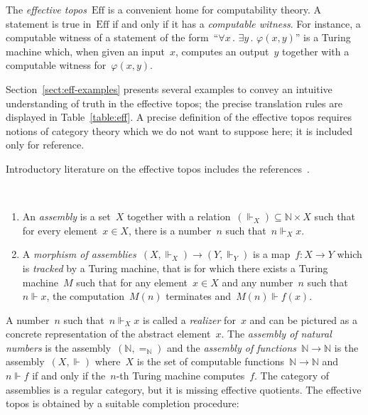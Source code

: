 \documentclass[graybox]{svmult}
\newcommand{\NN}{\mathbb{N}}
\newcommand{\Eff}{\mathrm{Ef{}f}}
\renewcommand{\_}{\mathpunct{.}\,}
\newcommand{\effective}{ef{}fective\xspace}
\newcommand{\?}{\,{:}\,}
\newcommand{\realizes}{\Vdash}
\begin{document}
The \emph{\effective topos}~$\Eff$ is a convenient home for computability
theory. A statement is true in~$\Eff$ if and only if it has a \emph{computable
witness}. For instance, a computable witness of a statement of the
form~``$\forall x\_ \exists y\_ \varphi(x,y)$'' is a Turing machine which, when
given an input~$x$, computes an output~$y$ together with a computable witness
for~$\varphi(x,y)$.

Section~\ref{sect:eff-examples} presents several examples to convey an
intuitive understanding of truth in the \effective topos; the precise
translation rules are displayed in Table~\ref{table:eff}. A precise definition
of the \effective topos requires notions of category theory which we do not
want to suppose here; it is included only for reference.

Introductory literature on the \effective topos
includes the references~\cite{hyland:effective-topos,oosten:realizability,phoa:effective,bauer:c2c}.

\begin{definition}\ \\[-1.2em]\begin{enumerate}
\item An \emph{assembly} is a set~$X$ together with a
relation~$({\realizes_X}) \subseteq \NN \times X$ such that for every element~$x
\in X$, there is a number~$n$ such that~$n \realizes_X x$.
\item A \emph{morphism of
assemblies}~$(X,{\realizes_X}) \to (Y,{\realizes_Y})$ is a map~$f : X \to Y$
which is \emph{tracked} by a Turing machine, that is for which there exists a
Turing machine~$M$ such that for any element~$x \in X$ and any number~$n$ such
that~$n \realizes x$, the computation~$M(n)$ terminates and~$M(n) \realizes
f(x)$.\end{enumerate}\end{definition}

A number~$n$ such that~$n \realizes_X x$ is called a \emph{realizer} for~$x$
and can be pictured as a concrete representation of the abstract element~$x$.
The \emph{assembly of natural numbers} is the assembly~$(\NN,{=_\NN})$ and the
\emph{assembly of functions~$\NN \to \NN$} is the
assembly~$(X,{\realizes})$ where~$X$ is the set of computable functions~$\NN
\to \NN$ and~$n \realizes f$ if and only if the~$n$-th Turing machine
computes~$f$. The category of assemblies is a regular category, but it is
missing \effective quotients. The \effective topos is obtained by a suitable
completion procedure:
\end{document}
